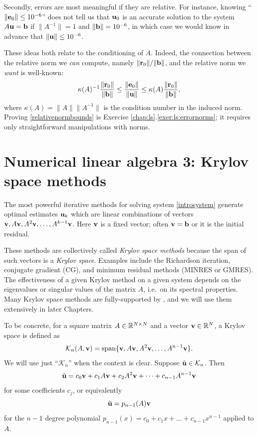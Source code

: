 Secondly, errors are most meaningful if they are relative.  For instance, knowing ``$\|\mathbf{e}_0\|\le 10^{-6}$'' does not tell us that $\mathbf{u}_0$ is an accurate solution to the system $A \mathbf{u} = \mathbf{b}$ if $\|A^{-1}\|=1$ and $\|\mathbf{b}\|= 10^{-6}$, in which case we would know in advance that $\|\mathbf{u}\|\le 10^{-6}$.

These ideas both relate to the conditioning of $A$.  Indeed, the connection between the relative norm we \emph{can} compute, namely $\|\mathbf{r}_0\|/\|\mathbf{b}\|$, and the relative norm we \emph{want} is well-known:
\begin{equation}
\kappa(A)^{-1} \frac{\|\mathbf{r}_0\|}{\|\mathbf{b}\|} \le \frac{\|\mathbf{e}_0\|}{\|\mathbf{u}\|} \le \kappa(A) \frac{\|\mathbf{r}_0\|}{\|\mathbf{b}\|}, \label{relativenormbounds}
\end{equation}
where $\kappa(A) = \|A\| \|A^{-1}\|$ is the condition number in the induced norm.  Proving \eqref{relativenormbounds} is Exercise \ref{chap:ls}.\ref{exer:ls:errornorms}; it requires only straightforward manipulations with norms.


\section{Numerical linear algebra 3: Krylov space methods}

The most powerful iterative methods for solving system \eqref{introsystem} generate optimal estimates $\mathbf{u}_k$ which are linear combinations of vectors $\mathbf{v},A\mathbf{v},A^2\mathbf{v},\dots,A^{k-1}\mathbf{v}$.  Here $\mathbf{v}$ is a fixed vector; often $\mathbf{v}=\mathbf{b}$ or it is the initial residual.

These methods are collectively called \emph{Krylov space methods} because the span of such vectors is a \emph{Krylov space}.  Examples include the Richardson iteration, conjugate gradient (CG), and minimum residual methods (MINRES or GMRES).  The effectiveness of a given Krylov method on a given system depends on the eigenvalues or singular values of the matrix $A$, i.e.~on its spectral properties.  Many Krylov space methods are fully-supported by \PETSc, and we will use them extensively in later Chapters.

To be concrete, for a square matrix $A\in \mathbb{R}^{N\times N}$ and a vector $\mathbf{v}\in\mathbb{R}^N$, a Krylov space is defined as
\begin{equation}
    \mathcal{K}_n(A,\mathbf{v}) = \operatorname{span}\{\mathbf{v},A\mathbf{v},A^2\mathbf{v},\dots,A^{n-1}\mathbf{v}\}. \label{eq:ls:krylovdefn}
\end{equation}
We will use just ``$\mathcal{K}_n$'' when the context is clear.  Suppose $\tilde{\mathbf{u}} \in \mathcal{K}_n$.  Then
    $$\tilde{\mathbf{u}} = c_0 \mathbf{v} + c_1 A \mathbf{v} + c_2 A^2 \mathbf{v} + \dots + c_{n-1} A^{n-1} \mathbf{v}$$
for some coefficients $c_j$, or equivalently
    $$\tilde{\mathbf{u}} = p_{n-1}(A) \mathbf{v}$$
for the $n-1$ degree polynomial $p_{n-1}(x) = c_0 + c_1 x + \dots + c_{n-1} x^{n-1}$ applied to $A$.

